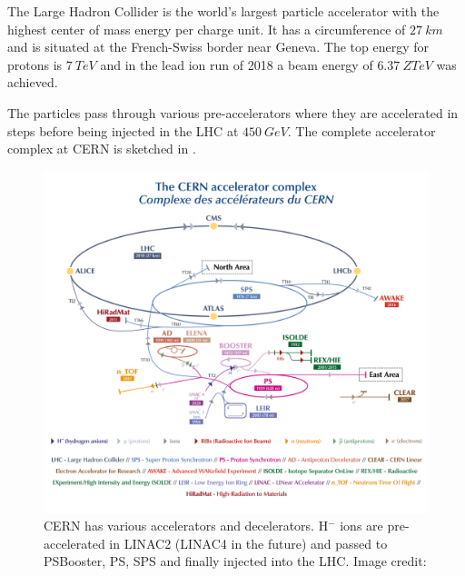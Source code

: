 The Large Hadron Collider is the world's largest particle accelerator with the highest center of mass
energy per charge unit. It has a circumference of $\SI{27}{km}$ and is situated at the French-Swiss 
border near Geneva. The top energy for protons is $\SI{7}{TeV}$
and in the lead ion run of 2018 a beam energy of $\SI{6.37}{Z TeV}$ was achieved.

The particles pass through various pre-accelerators where they are accelerated in steps before being
injected in the LHC at $\SI{450}{GeV}$. The complete accelerator complex at CERN is sketched in
.

\begin{figure}[h]
    \centering
    \includegraphics[width=\textwidth]{CCC-v2019-final-white_small}
    \caption{CERN has various accelerators and decelerators. H$^-$ ions are pre-accelerated
    in LINAC2 (LINAC4 in the future) and passed to PSBooster, PS, SPS and finally injected into
    the LHC. Image credit: \cite{CERN_AccCmplx}}
    \label{fig_cern_acc_cmplx}
\end{figure}
